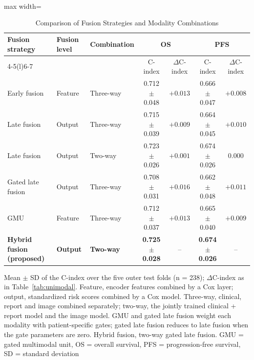 \documentclass{article}
\begin{document}
\begin{table}[htbp]
\centering
\setlength{\belowcaptionskip}{4pt}
\caption{Comparison of Fusion Strategies and Modality Combinations}
\label{tab:fusion}
\small\setlength{\tabcolsep}{4pt}
\begin{adjustbox}{max width=\textwidth}
\begin{tabular}{@{}lll cc cc@{}}
\toprule
Fusion strategy & Fusion level & Combination & \multicolumn{2}{c}{OS} & \multicolumn{2}{c}{PFS} \\
\cmidrule(lr){4-5}\cmidrule(l){6-7}
 & & & C-index & $\Delta$C-index & C-index & $\Delta$C-index \\
\midrule
Early fusion & Feature & Three-way & 0.712 $\pm$ 0.048 & $+0.013$ & 0.666 $\pm$ 0.047 & $+0.008$ \\
Late fusion & Output & Three-way & 0.715 $\pm$ 0.039 & $+0.009$ & 0.664 $\pm$ 0.045 & $+0.010$ \\
Late fusion & Output & Two-way & 0.723 $\pm$ 0.026 & $+0.001$ & 0.674 $\pm$ 0.026 & 0.000 \\
Gated late fusion & Output & Three-way & 0.708 $\pm$ 0.031 & $+0.016$ & 0.662 $\pm$ 0.048 & $+0.011$ \\
GMU & Feature & Three-way & 0.712 $\pm$ 0.037 & $+0.013$ & 0.665 $\pm$ 0.040 & $+0.009$ \\
\textbf{Hybrid fusion (proposed)} & \textbf{Output} & \textbf{Two-way} & \textbf{0.725 $\pm$ 0.028} & -- & \textbf{0.674 $\pm$ 0.026} & -- \\
\bottomrule
\end{tabular}%
\end{adjustbox}
\par\smallskip
\begin{minipage}{\textwidth}\footnotesize
Mean $\pm$ SD of the C-index over the five outer test folds (n = 238); $\Delta$C-index as in Table~\ref{tab:unimodal}. Feature, encoder features combined by a Cox layer; output, standardized risk scores combined by a Cox model. Three-way, clinical, report and image combined separately; two-way, the jointly trained clinical + report model and the image model. GMU and gated late fusion weight each modality with patient-specific gates; gated late fusion reduces to late fusion when the gate parameters are zero. Hybrid fusion, two-way gated late fusion. GMU = gated multimodal unit, OS = overall survival, PFS = progression-free survival, SD = standard deviation
\end{minipage}
\end{table}
\end{document}
